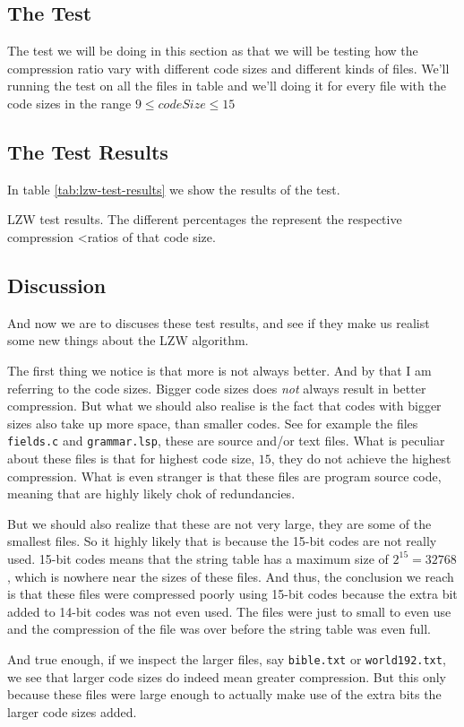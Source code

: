 \subsection{The Test}

The test we will be doing in this section as that we will be testing
how the compression ratio vary with different code sizes and different
kinds of files. We'll running the test on all the files in table and
we'll doing it for every file with the code sizes in the range $9 \leq
codeSize \leq 15$

\subsection{The Test Results}

In table \ref{tab:lzw-test-results} we show the results of the test.

\begin{table}
  \scriptsize
  \centering
  
  \caption{LZW test results. The different percentages the represent the respective compression <ratios of that code size.}
  \label{tab:lzw-test-results}
\end{table}

\subsection{Discussion}

And now we are to discuses these test results, and see if they make us
realist some new things about the LZW algorithm.

The first thing we notice is that more is not always better. And by
that I am referring to the code sizes. Bigger code sizes does
\textit{not} always result in better compression. But what we should
also realise is the fact that codes with bigger sizes also take up
more space, than smaller codes. See for example the files
\verb|fields.c| and \verb|grammar.lsp|, these are source and/or text
files. What is peculiar about these files is that for highest code
size, $15$, they do not achieve the highest compression. What is even
stranger is that these files are program source code, meaning that are
highly likely chok of redundancies.

But we should also realize that these are not very large, they are
some of the smallest files. So it highly likely that is because the
15-bit codes are not really used. 15-bit codes means that the string
table has a maximum size of $2^{15} = 32768$, which is nowhere near
the sizes of these files. And thus, the conclusion we reach is that
these files were compressed poorly using 15-bit codes because the
extra bit added to 14-bit codes was not even used. The files were just
to small to even use and the compression of the file was over before
the string table was even full.

And true enough, if we inspect the larger files, say \verb|bible.txt|
or \verb|world192.txt|, we see that larger code sizes do indeed mean
greater compression. But this only because these files were large
enough to actually make use of the extra bits the larger code sizes
added.

\FloatBarrier